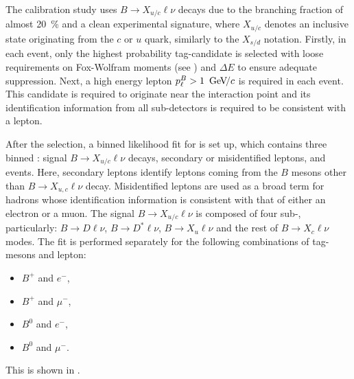 The calibration study uses $B\rightarrow X_{u/c} \ell \nu$ decays due to the branching fraction of almost 20~\% and a clean experimental signature, 
where $X_{u/c}$ denotes an inclusive state originating from the $c$ or $u$ quark, similarly to the $X_{s/d}$ notation.
Firstly, in each event, only the highest \FEI probability tag-\B candidate is selected with loose requirements on Fox-Wolfram moments (see ) and $\Delta E$ to ensure adequate \epem\ra\qqbar suppression.
Next, a high energy lepton $p_{\ell}^B>1~{\mathrm{\,Ge\kern -0.1em V\!/}c}$ is required in each event.
This candidate is required to originate near the interaction point and its identification information from all sub-detectors is required to be consistent with a lepton.

After the selection, a binned likelihood fit for \Mbc is set up, which contains three binned : signal $B\rightarrow X_{u/c}\ell\nu$ decays, 
secondary or misidentified leptons, and \epem\ra\qqbar events. 
Here, secondary leptons identify leptons coming from the $B$ mesons other than $B\rightarrow X_{u,c}\ell\nu$ decay.
Misidentified leptons are used as a broad term for hadrons whose identification information is consistent with that of either an electron or a muon.
The signal $B\rightarrow X_{u/c}\ell\nu$ \PDF is composed of four sub-, particularly: $B\rightarrow D\ell\nu$, $B\rightarrow D^*\ell\nu$, $B\rightarrow X_u\ell\nu$ and the rest of  $B\rightarrow X_c\ell\nu$ modes.
The fit is performed separately for the following combinations of tag-\B mesons and lepton:
\begin{itemize}
    \item $B^+$ and $e^-$,
    \item $B^+$ and $\mu^-$,
    \item $B^0$ and $e^-$,
    \item $B^0$ and $\mu^-$.
\end{itemize}
This is shown in .
